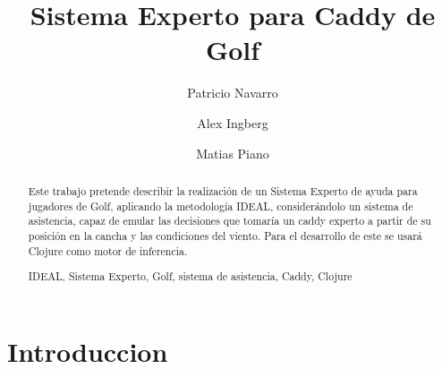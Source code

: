 \documentclass[runningheads,a4paper]{llncs}
\newcommand{\keywords}[1]{\par\addvspace\baselineskip
\noindent\keywordname\enspace\ignorespaces#1}
\begin{document}
\mainmatter  %

\title{Sistema Experto para Caddy de Golf}


%
%
\author{Patricio Navarro\and Alex Ingberg\and Matias Piano}
%


%
%

\maketitle


\begin{abstract}
Este trabajo pretende describir la realización de un Sistema Experto de ayuda para jugadores de Golf, aplicando la metodología IDEAL, considerándolo un sistema de asistencia, capaz de emular las decisiones que tomaría un caddy experto a partir de su posición en la cancha  y las condiciones del viento. Para el desarrollo de este se usará Clojure como motor de inferencia.
\keywords{IDEAL, Sistema Experto, Golf, sistema de asistencia, Caddy, Clojure}
\end{abstract}


\section{Introduccion}
\end{document}
